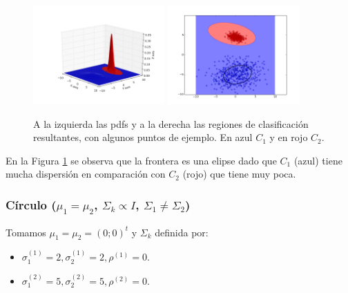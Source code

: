 \documentclass[a4paper,11pt]{article}
\begin{document}
\begin{figure}[h!]
\centering
\includegraphics[width=0.45\textwidth]{img/ej1-caso3b-pdf.png}
\includegraphics[width=0.45\textwidth]{img/ej1-caso3b-region.png}
\caption{A la izquierda las pdfs y a la derecha las regiones de clasificación resultantes, con algunos puntos de ejemplo. En azul $C_1$ y en rojo $C_2$.}
\label{ej1_caso3b}
\end{figure}

\newpage
En la Figura \ref{ej1_caso3b} se observa que la frontera es una elipse dado que $C_1$ (azul) tiene mucha dispersión en comparación con $C_2$ (rojo) que tiene muy poca.


\subsubsection*{Círculo ($\mu_1 = \mu_2$, $\Sigma_k \propto I$, $\Sigma_1 \neq \Sigma_2$)}
Tomamos $\mu_1 = \mu_2 = (0;0)^t$ y $\Sigma_k$ definida por:
\begin{itemize}
  \item $\sigma_1^{(1)} = 2, \sigma_2^{(1)} = 2, \rho^{(1)}=0 $.
  \item $\sigma_1^{(2)} = 5, \sigma_2^{(2)} = 5, \rho^{(2)}=0 $.
\end{itemize}
\end{document}
